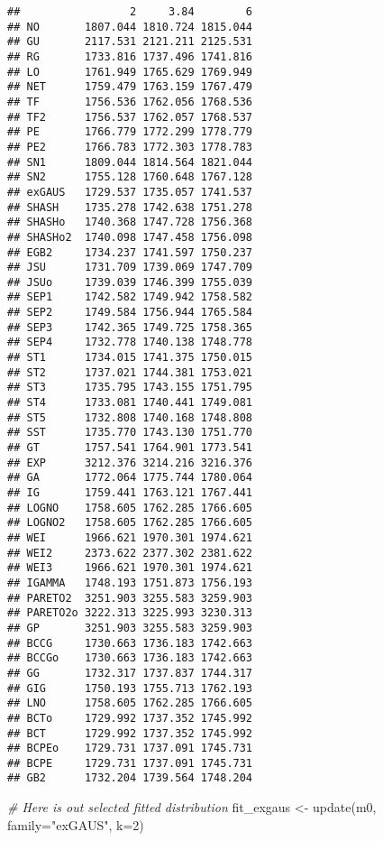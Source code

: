 \documentclass[
]{article}
\newenvironment{Shaded}{\begin{snugshade}}{\end{snugshade}}
\newcommand{\AttributeTok}[1]{\textcolor[rgb]{0.77,0.63,0.00}{#1}}
\newcommand{\CommentTok}[1]{\textcolor[rgb]{0.56,0.35,0.01}{\textit{#1}}}
\newcommand{\DecValTok}[1]{\textcolor[rgb]{0.00,0.00,0.81}{#1}}
\newcommand{\FunctionTok}[1]{\textcolor[rgb]{0.00,0.00,0.00}{#1}}
\newcommand{\NormalTok}[1]{#1}
\newcommand{\OtherTok}[1]{\textcolor[rgb]{0.56,0.35,0.01}{#1}}
\newcommand{\StringTok}[1]{\textcolor[rgb]{0.31,0.60,0.02}{#1}}
\begin{document}
\begin{verbatim}
##                 2     3.84        6
## NO       1807.044 1810.724 1815.044
## GU       2117.531 2121.211 2125.531
## RG       1733.816 1737.496 1741.816
## LO       1761.949 1765.629 1769.949
## NET      1759.479 1763.159 1767.479
## TF       1756.536 1762.056 1768.536
## TF2      1756.537 1762.057 1768.537
## PE       1766.779 1772.299 1778.779
## PE2      1766.783 1772.303 1778.783
## SN1      1809.044 1814.564 1821.044
## SN2      1755.128 1760.648 1767.128
## exGAUS   1729.537 1735.057 1741.537
## SHASH    1735.278 1742.638 1751.278
## SHASHo   1740.368 1747.728 1756.368
## SHASHo2  1740.098 1747.458 1756.098
## EGB2     1734.237 1741.597 1750.237
## JSU      1731.709 1739.069 1747.709
## JSUo     1739.039 1746.399 1755.039
## SEP1     1742.582 1749.942 1758.582
## SEP2     1749.584 1756.944 1765.584
## SEP3     1742.365 1749.725 1758.365
## SEP4     1732.778 1740.138 1748.778
## ST1      1734.015 1741.375 1750.015
## ST2      1737.021 1744.381 1753.021
## ST3      1735.795 1743.155 1751.795
## ST4      1733.081 1740.441 1749.081
## ST5      1732.808 1740.168 1748.808
## SST      1735.770 1743.130 1751.770
## GT       1757.541 1764.901 1773.541
## EXP      3212.376 3214.216 3216.376
## GA       1772.064 1775.744 1780.064
## IG       1759.441 1763.121 1767.441
## LOGNO    1758.605 1762.285 1766.605
## LOGNO2   1758.605 1762.285 1766.605
## WEI      1966.621 1970.301 1974.621
## WEI2     2373.622 2377.302 2381.622
## WEI3     1966.621 1970.301 1974.621
## IGAMMA   1748.193 1751.873 1756.193
## PARETO2  3251.903 3255.583 3259.903
## PARETO2o 3222.313 3225.993 3230.313
## GP       3251.903 3255.583 3259.903
## BCCG     1730.663 1736.183 1742.663
## BCCGo    1730.663 1736.183 1742.663
## GG       1732.317 1737.837 1744.317
## GIG      1750.193 1755.713 1762.193
## LNO      1758.605 1762.285 1766.605
## BCTo     1729.992 1737.352 1745.992
## BCT      1729.992 1737.352 1745.992
## BCPEo    1729.731 1737.091 1745.731
## BCPE     1729.731 1737.091 1745.731
## GB2      1732.204 1739.564 1748.204
\end{verbatim}

\begin{Shaded}
\begin{Highlighting}[]
\CommentTok{\# Here is out selected fitted distribution }
\NormalTok{fit\_exgaus }\OtherTok{\textless{}{-}} \FunctionTok{update}\NormalTok{(m0, }\AttributeTok{family=}\StringTok{"exGAUS"}\NormalTok{, }\AttributeTok{k=}\DecValTok{2}\NormalTok{)}
\end{Highlighting}
\end{Shaded}
\end{document}
